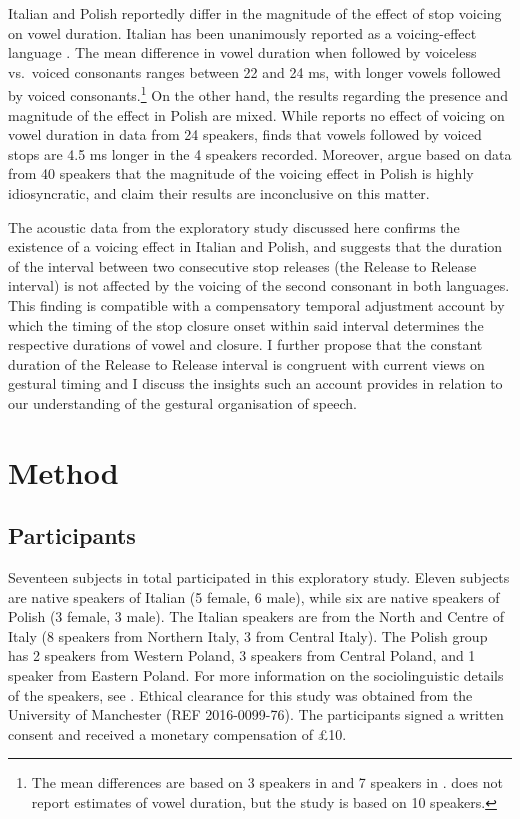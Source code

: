 \documentclass[preprint]{JASAnew}
\begin{document}
Italian and Polish reportedly differ in the magnitude of the effect of
stop voicing on vowel duration. Italian has been unanimously reported as
a voicing-effect language
\citep{caldognetto1979, farnetani1986, esposito2002}. The mean
difference in vowel duration when followed by voiceless vs.~voiced
consonants ranges between 22 and 24 ms, with longer vowels followed by
voiced
consonants.\footnote{The mean differences are based on 3 speakers in \citealt{farnetani1986} and 7 speakers in \citealt{esposito2002}. \citealt{caldognetto1979} does not report estimates of vowel duration, but the study is based on 10 speakers.}
On the other hand, the results regarding the presence and magnitude of
the effect in Polish are mixed. While \citet{keating1984} reports no
effect of voicing on vowel duration in data from 24 speakers,
\citet{nowak2006} finds that vowels followed by voiced stops are 4.5 ms
longer in the 4 speakers recorded. Moreover, \citet{malisz2008} argue
based on data from 40 speakers that the magnitude of the voicing effect
in Polish is highly idiosyncratic, and claim their results are
inconclusive on this matter.

The acoustic data from the exploratory study discussed here confirms the
existence of a voicing effect in Italian and Polish, and suggests that
the duration of the interval between two consecutive stop releases (the
Release to Release interval) is not affected by the voicing of the
second consonant in both languages. This finding is compatible with a
compensatory temporal adjustment account by which the timing of the stop
closure onset within said interval determines the respective durations
of vowel and closure. I further propose that the constant duration of
the Release to Release interval is congruent with current views on
gestural timing \citep{goldstein2014} and I discuss the insights such an
account provides in relation to our understanding of the gestural
organisation of speech.

\section{Method}\label{method}

\label{s:method}

\subsection{Participants}\label{participants}

Seventeen subjects in total participated in this exploratory study.
Eleven subjects are native speakers of Italian (5 female, 6 male), while
six are native speakers of Polish (3 female, 3 male). The Italian
speakers are from the North and Centre of Italy (8 speakers from
Northern Italy, 3 from Central Italy). The Polish group has 2 speakers
from Western Poland, 3 speakers from Central Poland, and 1 speaker from
Eastern Poland. For more information on the sociolinguistic details of
the speakers, see . Ethical clearance for this study
was obtained from the University of Manchester (REF 2016-0099-76). The
participants signed a written consent and received a monetary
compensation of £10.
\end{document}

